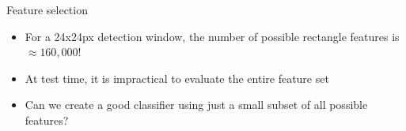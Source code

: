 \documentclass[compress]{beamer}
\begin{document}
\begin{frame}{Feature selection}

\pause
\begin{itemize}
\item  For a 24x24px detection window, the number of possible rectangle
  features is $\approx160,000$!
\item At test time, it is impractical to evaluate the entire feature set
\item Can we create a good classifier using just a small subset of all
  possible features?

\end{itemize}

\end{frame}
\end{document}

